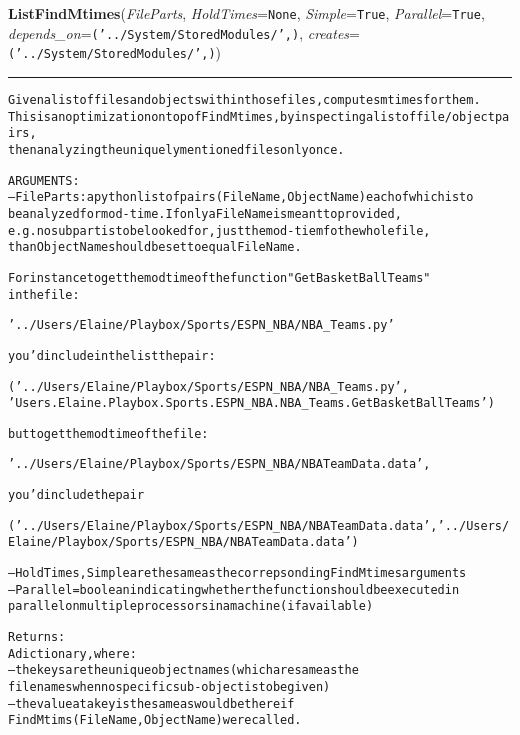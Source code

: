     \label{System:Storage:ListFindMtimes}

    \vspace{0.5ex}

\hspace{.8\funcindent}\begin{boxedminipage}{\funcwidth}

    \raggedright \textbf{ListFindMtimes}(\textit{FileParts}, \textit{HoldTimes}={\tt None}, \textit{Simple}={\tt True}, \textit{Parallel}={\tt True}, \textit{depends\_on}={\tt ('../System/StoredModules/',)}, \textit{creates}={\tt ('../System/StoredModules/',)})

    \vspace{-1.5ex}

    \rule{\textwidth}{0.5\fboxrule}
\setlength{\parskip}{2ex}
\begin{alltt}

Given a list of files and objects within those files, computes mtimes for them. 
This is an optimization on top of FindMtimes, by inspecting a list of file/object pairs,
then analyzing the uniquely mentioned files only once. 

ARGUMENTS:
--FileParts: a python list of pairs (FileName, ObjectName) each of which is to 
be analyzed for mod-time.   If only a FileName is meant to provided, 
e.g. no subpart is to be looked for, just the mod-tiem fo the whole file, 
than ObjectName should be set to equal FileName.  
        
For instance to get the modtime of the function "GetBasketBallTeams"
in the file:

'../Users/Elaine/Playbox/Sports/ESPN\_NBA/NBA\_Teams.py' 

you'd include in the list the pair:

('../Users/Elaine/Playbox/Sports/ESPN\_NBA/NBA\_Teams.py',
'Users.Elaine.Playbox.Sports.ESPN\_NBA.NBA\_Teams.GetBasketBallTeams')

but to get the modtime of the file:

'../Users/Elaine/Playbox/Sports/ESPN\_NBA/NBATeamData.data', 

you'd include the pair

('../Users/Elaine/Playbox/Sports/ESPN\_NBA/NBATeamData.data', '../Users/Elaine/Playbox/Sports/ESPN\_NBA/NBATeamData.data')
        
--HoldTimes, Simple are the same as the correpsonding FindMtimes arguments
--Parallel = boolean indicating whether the function should be executed in 
parallel on multiple processors in a machine (if available)

Returns:
A dictionary, where:
        --the keys are the unique object names (which are same as the
        file names when no specific sub-object is to be given) 
        --the value at a key is the same as would be there if 
        FindMtims(FileName,ObjectName) were called.     
\end{alltt}

\setlength{\parskip}{1ex}
    \end{boxedminipage}

